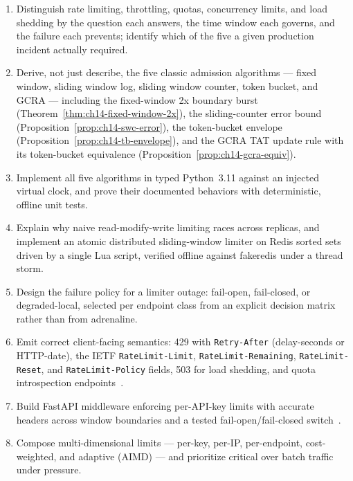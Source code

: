 \begin{enumerate}[label=\textbf{LO-\arabic*.}, leftmargin=2.6cm]
  \item Distinguish rate limiting, throttling, quotas, concurrency limits,
        and load shedding by the question each answers, the time window each
        governs, and the failure each prevents; identify which of the five a
        given production incident actually required.
  \item Derive, not just describe, the five classic admission algorithms ---
        fixed window, sliding window log, sliding window counter, token
        bucket, and GCRA --- including the fixed-window 2x boundary burst
        (Theorem~\ref{thm:ch14-fixed-window-2x}), the sliding-counter error
        bound (Proposition~\ref{prop:ch14-swc-error}), the token-bucket
        envelope (Proposition~\ref{prop:ch14-tb-envelope}), and the GCRA
        TAT update rule with its token-bucket equivalence
        (Proposition~\ref{prop:ch14-gcra-equiv}).
  \item Implement all five algorithms in typed Python~3.11 against an
        injected virtual clock, and prove their documented behaviors with
        deterministic, offline unit tests.
  \item Explain why naive read-modify-write limiting races across replicas,
        and implement an atomic distributed sliding-window limiter on Redis
        sorted sets driven by a single Lua script, verified offline against
        fakeredis under a thread storm.
  \item Design the failure policy for a limiter outage: fail-open,
        fail-closed, or degraded-local, selected per endpoint class from an
        explicit decision matrix rather than from adrenaline.
  \item Emit correct client-facing semantics: 429 with \texttt{Retry-After}
        (delay-seconds or HTTP-date), the IETF \texttt{RateLimit-Limit},
        \texttt{RateLimit-Remaining}, \texttt{RateLimit-Reset}, and
        \texttt{RateLimit-Policy} fields, 503 for load shedding, and quota
        introspection endpoints~\cite{ietf_ratelimit_headers,rfc9110}.
  \item Build FastAPI middleware enforcing per-API-key limits with accurate
        headers across window boundaries and a tested fail-open/fail-closed
        switch~\cite{fastapidocs}.
  \item Compose multi-dimensional limits --- per-key, per-IP, per-endpoint,
        cost-weighted, and adaptive (AIMD) --- and prioritize critical over
        batch traffic under pressure.
\end{enumerate}

